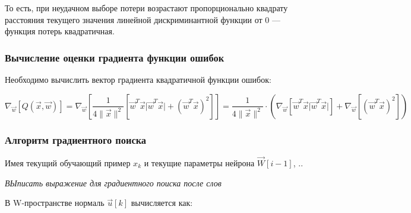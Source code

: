 \documentclass{article}
\numberwithin{equation}{subsection}
\begin{document}
То есть, при неудачном выборе потери возрастают пропорционально квадрату расстояния 
текущего значения линейной дискриминантной функции от 0 --- функция потерь
квадратичная. 




\subsubsection{Вычисление оценки градиента функции ошибок}

Необходимо вычислить вектор градиента квадратичной функции ошибок:

\begin{equation}
    \nabla_{\vec{w}} \left[ Q\left( \vec{x}, \vec{w} \right) \right] =
    \nabla_{\vec{w}} 
    \left[ 
        \dfrac{1}{4 \| \vec{x} \| ^2 } 
        \left[
            \vec{w}^T \vec{x} \lvert \vec{w}^T \vec{x} \rvert +
            \left( \vec{w}^T \vec{x} \right)^2
        \right] 
    \right] =
    \dfrac{1}{4 \| \vec{x} \| ^2 } \cdot
    \left(
        \nabla_{\vec{w}}
        \left[
            \vec{w}^T \vec{x} \lvert \vec{w}^T \vec{x} \rvert
        \right] +
        \nabla_{\vec{w}}
        \left[
            \left( \vec{w}^T \vec{x} \right)^2
        \right]
    \right)
\end{equation}






\subsubsection{Алгоритм градиентного поиска}


Имея текущий обучающий пример $x_k$ и текущие параметры нейрона $\vec{W}[i-1]$,
..

\begin{myquote}
    \textit{ВЫписать выражение для градиентного поиска после слов}
\end{myquote}

В W-пространстве нормаль $\vec{u}[k]$ вычисляется как: 
\end{document}

